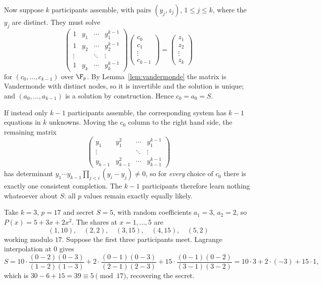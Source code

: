 Now suppose $k$ participants assemble, with pairs $(y_j, z_j)$, $1 \le j\le k$, where the $y_j$ are distinct. They must solve
$$\begin{pmatrix}
	1 & y_1 & \cdots & y_1^{k-1}\\
	1 & y_2 & \cdots & y_2^{k-1}\\
	\vdots & & \ddots & \vdots\\
	1 & y_k & \cdots & y_k^{k-1}
\end{pmatrix}\begin{pmatrix}c_0\\c_1\\\vdots\\c_{k-1}\end{pmatrix} = \begin{pmatrix}z_1\\z_2\\\vdots\\z_k\end{pmatrix}$$
for $(c_0,\dots,c_{k-1})$ over $\F_p$. By Lemma~\ref{lem:vandermonde} the matrix is Vandermonde with distinct nodes, so it is invertible and the solution is unique; and $(a_0,\dots,a_{k-1})$ is a solution by construction. Hence $c_0 = a_0 = S$.

If instead only $k-1$ participants assemble, the corresponding system has $k-1$ equations in $k$ unknowns. Moving the $c_0$ column to the right hand side, the remaining matrix
$$\begin{pmatrix}
	y_1 & y_1^2 & \cdots & y_1^{k-1}\\
	\vdots & & \ddots & \vdots\\
	y_{k-1} & y_{k-1}^2 & \cdots & y_{k-1}^{k-1}
\end{pmatrix}$$
has determinant $y_1\cdots y_{k-1}\prod_{j<i}(y_i-y_j) \ne 0$, so for \emph{every} choice of $c_0$ there is exactly one consistent completion. The $k-1$ participants therefore learn nothing whatsoever about $S$: all $p$ values remain exactly equally likely.

\begin{example}
	Take $k = 3$, $p = 17$ and secret $S = 5$, with random coefficients $a_1 = 3$, $a_2 = 2$, so $P(x) = 5+3x+2x^2$. The shares at $x = 1,\dots,5$ are
	$$(1,10),\quad (2,2),\quad (3,15),\quad (4,15),\quad(5,2)$$
	working modulo $17$. Suppose the first three participants meet. Lagrange interpolation at $0$ gives
	$$S = 10\cdot\frac{(0-2)(0-3)}{(1-2)(1-3)} + 2\cdot\frac{(0-1)(0-3)}{(2-1)(2-3)} + 15\cdot\frac{(0-1)(0-2)}{(3-1)(3-2)} = 10\cdot3 + 2\cdot(-3)+15\cdot1,$$
	which is $30-6+15 = 39 \equiv 5 \pmod{17}$, recovering the secret.
\end{example}

